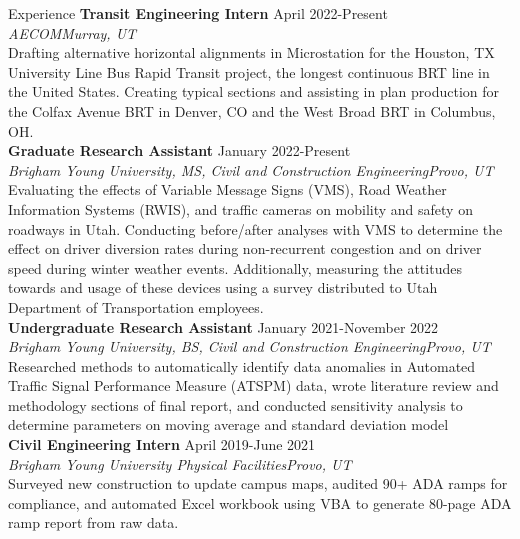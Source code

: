\documentclass{resume} %
\begin{document}
\begin{rSection}{Experience}
{\bf Transit Engineering Intern} \hfill {April 2022-Present} \\
{\em AECOM}\hfill {\em Murray, UT} \\
Drafting alternative horizontal alignments in Microstation for the Houston, TX University Line Bus Rapid Transit project, the longest continuous BRT line in the United States. Creating typical sections and assisting in plan production for the Colfax Avenue BRT in Denver, CO and the West Broad BRT in Columbus, OH.   \\

{\bf Graduate Research Assistant} \hfill {January 2022-Present} \\
{\em Brigham Young University, MS, Civil and Construction Engineering}\hfill {\em Provo, UT} \\
Evaluating the effects of Variable Message Signs (VMS), Road Weather Information Systems (RWIS), and traffic cameras on mobility and safety on roadways in Utah. Conducting before/after analyses with VMS to determine the effect on driver diversion rates during non-recurrent congestion and on driver speed during winter weather events. Additionally, measuring the attitudes towards and usage of these devices using a survey distributed to Utah Department of Transportation employees. \\

{\bf Undergraduate Research Assistant} \hfill {January 2021-November 2022} \\
{\em Brigham Young University, BS, Civil and Construction Engineering}\hfill {\em Provo, UT} \\
Researched methods to automatically identify data anomalies in Automated Traffic Signal Performance Measure (ATSPM) data, wrote literature review and methodology sections of final report, and conducted sensitivity analysis to determine parameters on moving average and standard deviation model \\

{\bf Civil Engineering Intern} \hfill {April 2019-June 2021} \\
{\em Brigham Young University Physical Facilities}\hfill {\em Provo, UT} \\
Surveyed new construction to update campus maps, audited 90+ ADA ramps for compliance, and automated Excel workbook using VBA to generate 80-page ADA ramp report from raw data.

\end{rSection}
\end{document}
